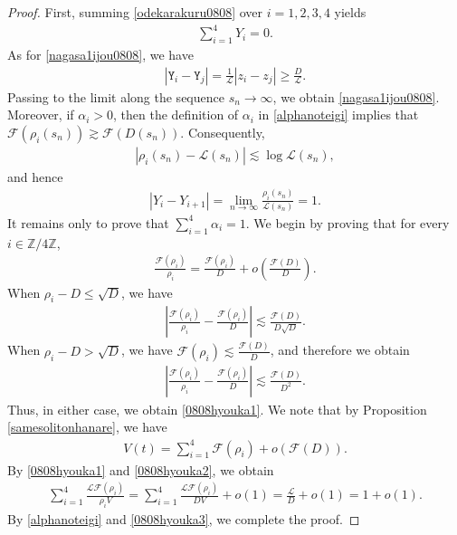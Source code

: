 \documentclass[10pt,a4paper]{amsart}
\numberwithin{equation}{section}
\begin{document}
\begin{proof}
First, summing \eqref{odekarakuru0808} over $i=1,2,3,4$ yields
\begin{align*}
\sum_{i=1}^4Y_i=0.
\end{align*}
As for \eqref{nagasa1ijou0808}, we have
\begin{align*}
\left|\mathtt{Y}_i-\mathtt{Y}_j\right|
=
\frac{1}{\mathcal{L}}\left|z_i-z_j\right|
\geq
\frac{D}{\mathcal{L}}.
\end{align*}
Passing to the limit along the sequence $s_n\to\infty$, we obtain \eqref{nagasa1ijou0808}. Moreover, if $\alpha_i>0$, then the definition of $\alpha_i$ in
\eqref{alphanoteigi} implies that $\mathcal{F}(\rho_i(s_n)) \gtrsim \mathcal{F}(D(s_n))$. Consequently,
\begin{align*}
\left|\rho_i(s_n)-\mathcal{L}(s_n)\right|
\lesssim \log{\mathcal{L}(s_n)},
\end{align*}
and hence
\begin{align*}
|Y_i-Y_{i+1}|
=
\lim_{n\to\infty}
\frac{\rho_i(s_n)}{\mathcal{L}(s_n)}
=1.
\end{align*}
It remains only to prove that $\sum_{i=1}^4\alpha_i=1$. We begin by proving that for every $i\in\mathbb{Z}/4\mathbb{Z}$, 
\begin{align}\label{0808hyouka1}
\frac{\mathcal{F}(\rho_i)}{\rho_i}=\frac{\mathcal{F}(\rho_i)}{D}+o\left(\frac{\mathcal{F}(D)}{D}\right).
\end{align}
When $\rho_i-D\leq \sqrt{D}$, we have
\begin{align*}
\left|\frac{\mathcal{F}(\rho_i)}{\rho_i}-\frac{\mathcal{F}(\rho_i)}{D}\right|\lesssim \frac{\mathcal{F}(D)}{D\sqrt{D}}.
\end{align*}
When $\rho_i-D>\sqrt{D}$, we have $\mathcal{F}(\rho_i)\lesssim \frac{\mathcal{F}(D)}{D}$, and therefore we obtain
\begin{align*}
\left|\frac{\mathcal{F}(\rho_i)}{\rho_i}-\frac{\mathcal{F}(\rho_i)}{D}\right|\lesssim \frac{\mathcal{F}(D)}{D^2}.
\end{align*}
Thus, in either case, we obtain \eqref{0808hyouka1}. We note that by Proposition \ref{samesolitonhanare}, we have
\begin{align}\label{0808hyouka2}
V(t)=\sum_{i=1}^4\mathcal{F}(\rho_i)+o\left(\mathcal{F}(D)\right).
\end{align}
By \eqref{0808hyouka1} and \eqref{0808hyouka2}, we obtain
\begin{align}\label{0808hyouka3}
\sum_{i=1}^4\frac{\mathcal{L}\mathcal{F}(\rho_i)}{\rho_iV}=\sum_{i=1}^4\frac{\mathcal{L}\mathcal{F}(\rho_i)}{DV}+o(1)=\frac{\mathcal{L}}{D}+o(1)=1+o(1).
\end{align}
By \eqref{alphanoteigi} and \eqref{0808hyouka3}, we complete the proof.

\end{proof}
\end{document}
